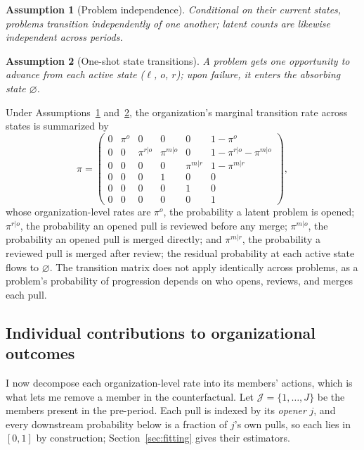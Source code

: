 \documentclass[12pt,notitlepage]{article}
\newtheorem{assumption}{Assumption}
\begin{document}
\begin{assumption}[Problem independence]
\label{asm:independence}
Conditional on their current states, problems transition independently of one another; latent counts are likewise independent across periods.
\end{assumption}

\begin{assumption}[One-shot state transitions]
\label{asm:one-shot}
A problem gets one opportunity to advance from each active state ($\ell$, $o$, $r$); upon failure, it enters the absorbing state $\varnothing$.
\end{assumption}

Under Assumptions~\ref{asm:independence} and~\ref{asm:one-shot}, the organization's marginal transition rate across states is summarized by 
\[
\pi =
\begin{pmatrix}
0 & \pi^o & 0 & 0 & 0 & 1-\pi^o \\
0 & 0 & \pi^{r|o} & \pi^{m|o} & 0 & 1-\pi^{r|o}-\pi^{m|o} \\
0 & 0 & 0 & 0 & \pi^{m|r} & 1-\pi^{m|r} \\
0 & 0 & 0 & 1 & 0 & 0 \\
0 & 0 & 0 & 0 & 1 & 0 \\
0 & 0 & 0 & 0 & 0 & 1
\end{pmatrix},
\]
whose organization-level rates are $\pi^o$, the probability a latent problem is opened; $\pi^{r|o}$, the probability an opened pull is reviewed before any merge; $\pi^{m|o}$, the probability an opened pull is merged directly; and $\pi^{m|r}$, the probability a reviewed pull is merged after review; the residual probability at each active state flows to $\varnothing$.
The transition matrix does not apply identically across problems, as a problem's probability of progression depends on who opens, reviews, and merges each pull.

\subsection{Individual contributions to organizational outcomes}
\label{sec:contributions}

I now decompose each organization-level rate into its members' actions, which is what lets me remove a member in the counterfactual.
Let $\mathcal{J} = \{1,\dots,J\}$ be the members present in the pre-period.
Each pull is indexed by its \emph{opener} $j$, and every downstream probability below is a fraction of $j$'s own pulls, so each lies in $[0,1]$ by construction; Section~\ref{sec:fitting} gives their estimators.
\end{document}
